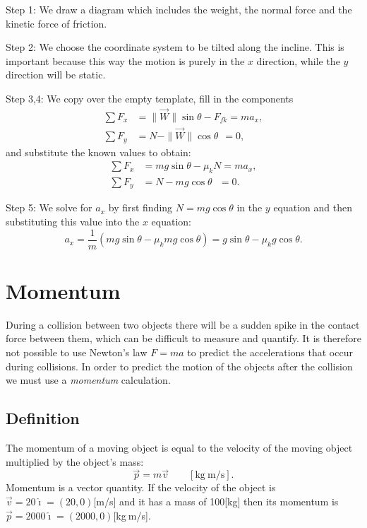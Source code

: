\documentclass[letterpaper,9pt,journal]{IEEEtran}
\newcommand{\be}{\begin{equation}}
\newcommand{\ee}{\end{equation}}
\begin{document}
Step 1: We draw a diagram which includes the weight, the normal force and the kinetic force of friction.

Step 2: We choose the coordinate system to be tilted along the incline. This is important because this way the motion is purely  in the $x$ direction,
while the $y$ direction will be static.


Step 3,4: We copy over the empty template, fill in the components
\begin{align*}
 \sum F_x  &= \|\vec{W}\|\sin\theta - F_{fk}  = ma_x, \\
 \sum F_y &= N - \|\vec{W}\|\cos\theta  \ \  = 0, 
\end{align*}
and substitute the known values to obtain:
\begin{align*}
 \sum F_x &= mg\sin\theta - \mu_kN  = ma_x, \\
 \sum F_y &= N - mg\cos\theta  \ \ \  = 0. 
\end{align*}

Step 5: We solve for $a_x$ by first finding $N=mg\cos\theta$ in the $y$ equation 
and then substituting this value into the $x$ equation:
\[
 a_x 
 = \frac{1}{m}\left( mg\sin\theta - \mu_k mg\cos\theta \right)
 = g\sin\theta - \mu_k g\cos\theta.
\]




\section{Momentum}
\label{sec:momentum}

During a collision between two objects there will be a sudden spike in the contact force between them,
which can be difficult to measure and quantify. 
It is therefore not possible to use Newton's law $F=ma$ to predict the accelerations that occur during collisions.
In order to predict the motion of the objects after the collision we must use a \emph{momentum} calculation.

\vspace{-3mm}
\subsection{Definition}

The momentum of a moving object is equal to the velocity of the moving object 
multiplied by the object's mass:
\be 
 \vec{p} = m\vec{v} \qquad [\text{kg}\:\text{m}/\text{s}].
 \label{MOMENTUM}
\ee
Momentum is a vector quantity.
If the velocity of the object is $\vec{v}=20\hat{\imath}=(20,0)$[m/s]
and it has a mass of 100[kg] then its momentum is $\vec{p}=2000\hat{\imath}=(2000,0)$[kg$\:$m/s].
\end{document}
